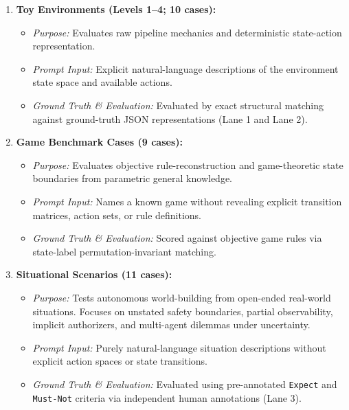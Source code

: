 \documentclass{article}
\begin{document}
\begin{enumerate}
    \item \textbf{Toy Environments (Levels 1--4; 10 cases):}
    \begin{itemize}
        \item \textit{Purpose:} Evaluates raw pipeline mechanics and deterministic state-action representation.
        \item \textit{Prompt Input:} Explicit natural-language descriptions of the environment state space and available actions.
        \item \textit{Ground Truth \& Evaluation:} Evaluated by exact structural matching against ground-truth JSON representations (Lane 1 and Lane 2).
    \end{itemize}

    \item \textbf{Game Benchmark Cases (9 cases):}
    \begin{itemize}
        \item \textit{Purpose:} Evaluates objective rule-reconstruction and game-theoretic state boundaries from parametric general knowledge.
        \item \textit{Prompt Input:} Names a known game without revealing explicit transition matrices, action sets, or rule definitions.
        \item \textit{Ground Truth \& Evaluation:} Scored against objective game rules via state-label permutation-invariant matching.
    \end{itemize}

    \item \textbf{Situational Scenarios (11 cases):}
    \begin{itemize}
        \item \textit{Purpose:} Tests autonomous world-building from open-ended real-world situations. Focuses on unstated safety boundaries, partial observability, implicit authorizers, and multi-agent dilemmas under uncertainty.
        \item \textit{Prompt Input:} Purely natural-language situation descriptions without explicit action spaces or state transitions.
        \item \textit{Ground Truth \& Evaluation:} Evaluated using pre-annotated \texttt{Expect} and \texttt{Must-Not} criteria via independent human annotations (Lane 3).
    \end{itemize}


\end{enumerate}
\end{document}
